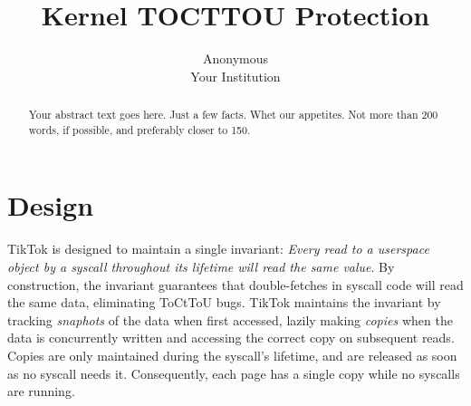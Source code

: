 \documentclass[letterpaper,twocolumn,10pt, anonymous]{article}
\begin{document}


\newcommand\tocttou[0]{ToCtToU\xspace}
\newcommand\tiktok[0]{TikTok\xspace}


\newcommand\TODO[1]{\noindent{\color{green} {\bf \fbox{TODO}} {\it#1}}}

\date{}

\title{\Large \bf Kernel TOCTTOU Protection}

\author{
{\rm Anonymous}\\
Your Institution
} %

\maketitle

\begin{abstract}
Your abstract text goes here. Just a few facts. Whet our appetites.
Not more than 200 words, if possible, and preferably closer to 150.
\end{abstract}

\section{Design}

\tiktok is designed to maintain a single invariant: 
\emph{Every read to a userspace object by a syscall throughout its lifetime 
will read the same value}.
By construction, the invariant guarantees that double-fetches in syscall
code will read the same data, eliminating \tocttou bugs. 
\tiktok maintains the invariant by tracking \emph{snaphots} of the data
when first accessed, lazily making \emph{copies} when the data is concurrently 
written and accessing the correct copy on subsequent reads.
Copies are only maintained during the syscall's lifetime, and are released as 
soon as no syscall needs it.
Consequently, each page has a single copy while no syscalls are running.
\end{document}
